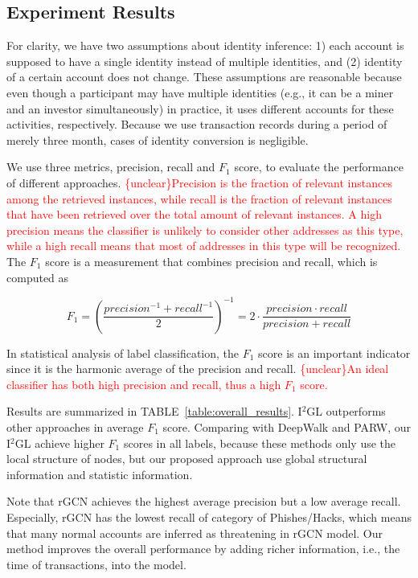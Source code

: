 \subsection{Experiment Results}
For clarity, we have two assumptions about identity inference: 1) each account is supposed to have a single identity instead of multiple identities, and (2) identity of a certain account does not change. These assumptions are reasonable because even though a participant may have multiple identities (e.g., it can be a miner and an investor simultaneously) in practice, it uses different accounts for these activities, respectively. Because we use transaction records during a period of merely three month, cases of identity conversion is negligible.

We use three metrics, precision, recall and $F_1$ score, to evaluate the performance of different approaches. \textcolor{red}{\{unclear\}Precision is the fraction of relevant instances among the retrieved instances, while recall is the fraction of relevant instances that have been retrieved over the total amount of relevant instances. A high precision means the classifier is unlikely to consider other addresses as this type, while a high recall means that most of addresses in this type will be recognized.} The $F_1$ score is a measurement that combines precision and recall, which is computed as

\begin{equation}
F_1=(\frac{{precision}^{-1}+{recall}^{-1}}{2})^{-1}=2\cdot\frac{precision \cdot recall}{precision + recall}
\end{equation}

In statistical analysis of label classification, the $F_1$ score is an important indicator since it is the harmonic average of the precision and recall. \textcolor{red}{\{unclear\}An ideal classifier has both high precision and recall, thus a high $F_1$ score.}

Results are summarized in TABLE~\ref{table:overall_results}. I$^2$GL outperforms other approaches in average $F_1$ score. Comparing with DeepWalk and PARW, our I$^2$GL achieve higher $F_1$ scores in all labels, because these methods only use the local structure of nodes, but our proposed approach use global structural information and statistic information.

Note that rGCN achieves the highest average precision but a low average recall. Especially, rGCN has the lowest recall of category of Phishes/Hacks, which means that many normal accounts are inferred as threatening in rGCN model. Our method improves the overall performance by adding richer information, i.e., the time of transactions, into the model.

